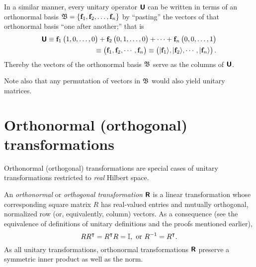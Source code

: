 In a similar manner, every unitary operator  $\textsf{\textbf{U}}$  can be written in terms of an orthonormal basis
${\frak B}=\{{\bf f}_1,  {\bf f}_2, \ldots , {\bf f}_n\}$
by ``pasting'' the  vectors of that orthonormal basis ``one after another;''
that is
\begin{equation}
\begin{split}
\textsf{\textbf{U}}
\equiv
{\bf f}_1 \begin{pmatrix} 1,0,\ldots ,0\end{pmatrix} +
{\bf f}_2 \begin{pmatrix} 0,1,\ldots ,0\end{pmatrix} +
\cdots +
{\bf f}_n \begin{pmatrix} 0,0,\ldots ,1\end{pmatrix}   \\
\equiv
\begin{pmatrix}
{\bf f}_1,
{\bf f}_2,
\cdots,
{\bf f}_n
\end{pmatrix}
\equiv
\begin{pmatrix}
\vert {\bf f}_1 \rangle ,
\vert {\bf f}_2 \rangle ,
\cdots,
\vert {\bf f}_n \rangle
\end{pmatrix}
.
\end{split}
\label{2015-m-ch-fdlvs-uniascolv}
\end{equation}
Thereby the vectors of the orthonormal basis  ${\frak B}$ serve as the
columns of $\textsf{\textbf{U}}$.

Note also that any permutation of vectors in ${\frak B}$ would also yield unitary matrices.


\section{Orthonormal (orthogonal) transformations}
\label{2015-m-ch-fdlvs-orthproj}

Orthonormal (orthogonal) transformations are special cases of unitary transformations restricted to {\em real} Hilbert space.

An {\em orthonormal} or {\em orthogonal transformation} $\textsf{\textbf{R}}$ is a linear transformation
whose corresponding square matrix $R$ has real-valued entries
and mutually orthogonal, normalized row (or, equivalently, column) vectors.
As a consequence (see the equivalence of definitions of unitary definitions and the proofs mentioned earlier),
\begin{equation}
RR^\intercal = R^\intercal R= {\Bbb I}, \textrm{ or } R^{-1}=R^\intercal  .
\end{equation}
As all unitary transformations, orthonormal transformations $\textsf{\textbf{R}}$
preserve a symmetric inner product as well as the norm.

